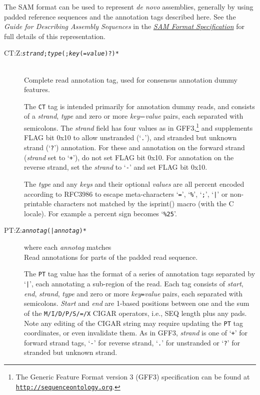 \documentclass[10pt]{article}
\newcommand{\tagregex}[1]{{\tt #1}}
\newcommand{\metavar}[1]{{\rm\emph{#1}}}
\begin{document}
The SAM format can be used to represent \emph{de novo} assemblies, generally by using padded reference sequences and the annotation tags described here.
See the \emph{Guide for Describing Assembly Sequences} in the \href{http://samtools.github.io/hts-specs/SAMv1.pdf}{\emph{SAM Format Specification}} for full details of this representation.

\begin{description}
\item[CT:Z:\tagregex{\metavar{strand};\metavar{type}(;\metavar{key}(=\metavar{value})?)*}]
\hfill\\
Complete read annotation tag, used for consensus annotation dummy features.

The {\tt CT} tag is intended primarily for annotation
dummy reads, and consists of a \emph{strand}, \emph{type} and zero or
more \emph{key}=\emph{value} pairs, each separated with semicolons.
The \emph{strand} field has four values as in GFF3,\footnote{The
Generic Feature Format version 3 (GFF3) specification can be found at
\href{http://www.sequenceontology.org/}{\tt http://sequenceontology.org}.}
and supplements FLAG
bit 0x10 to allow unstranded (`{\tt .}'), and stranded but unknown strand
(`{\tt ?}') annotation. For these and annotation on the forward strand
(\emph{strand} set to `{\tt +}'), do not set FLAG bit 0x10. For
annotation on the reverse strand, set the \emph{strand} to `{\tt -}'
and set FLAG bit 0x10.

The \emph{type} and any \emph{keys} and their
optional \emph{values} are all percent encoded according to
RFC3986 to escape meta-characters `{\tt =}', `{\tt \%}', `{\tt ;}',
`{\tt |}' or non-printable characters not matched by the isprint()
macro (with the C locale). For example a percent sign becomes
`{\tt \%25}'.

\item[PT:Z:\tagregex{\metavar{annotag}(|\metavar{annotag})*}]\enskip where each \metavar{annotag} matches\quad\tagregex{\metavar{start};\metavar{end};\metavar{strand};\metavar{type}(;\metavar{key}(=\metavar{value})?)*}
\hfill\\
Read annotations for parts of the padded read sequence.

The {\tt PT} tag value has the format of a series of annotation
tags separated by `{\tt |}', each annotating a sub-region of the read.
Each tag consists of \emph{start}, \emph{end}, \emph{strand},
\emph{type} and zero or more \emph{key}{\tt =}\emph{value} pairs, each
separated with semicolons. \emph{Start} and \emph{end} are 1-based
positions between one and the sum of the {\tt M/I/D/P/S/=/X}
{\sf CIGAR} operators, i.e., {\sf SEQ} length plus any pads.  Note
any editing of the CIGAR string may require updating the {\tt PT}
tag coordinates, or even invalidate them.
As in GFF3, \emph{strand} is one of `{\tt +}' for forward strand tags,
`{\tt -}' for reverse strand, `{\tt .}' for unstranded or `{\tt ?}'
for stranded but unknown strand.


\end{description}
\end{document}

